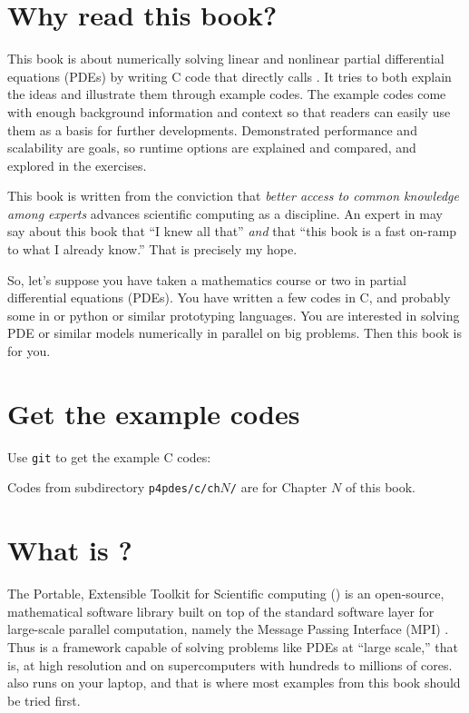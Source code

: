 
\section{Why read this book?}

This book is about numerically solving linear and nonlinear partial differential equations (PDEs) by writing C code \citep{KernighanRitchie1988} that directly calls \PETSc.  It tries to both explain the ideas and illustrate them through example codes.  The example codes come with enough background information and context so that readers can easily use them as a basis for further developments.  Demonstrated performance and scalability are goals, so runtime options are explained and compared, and explored in the exercises.

This book is written from the conviction that \emph{better access to common knowledge among experts} advances scientific computing as a discipline.  An expert in \PETSc may say about this book that ``I knew all that'' \emph{and} that ``this book is a fast on-ramp to what I already know.''  That is precisely my hope.

So, let's suppose you have taken a mathematics course or two in partial differential equations (PDEs).  You have written a few codes in C, and probably some in \Matlab or python or similar prototyping languages.  You are interested in solving PDE or similar models numerically in parallel on big problems.  Then this book is for you.

\section{Get the example codes}

Use \texttt{git} to get the example C codes:
Codes from subdirectory \texttt{p4pdes/c/ch}$N$\texttt{/} are for Chapter $N$ of this book.

\section{What is \PETSc?}

The Portable, Extensible Toolkit for Scientific computing (\PETSc) is an open-source, mathematical software library built on top of the standard software layer for large-scale parallel computation, namely the Message Passing Interface (MPI) \citep{Groppetal1999}.  Thus \PETSc is a framework capable of solving problems like PDEs at ``large scale,'' that is, at high resolution and on supercomputers with hundreds to millions of cores.  \PETSc also runs on your laptop, and that is where most examples from this book should be tried first.

